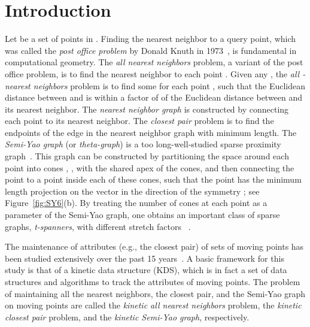\documentclass[11pt]{llncs}
\begin{document}
\section{Introduction}
Let  be a set of  points in . Finding the nearest neighbor to a query point, which was called the \textit{post office problem} by Donald Knuth in 1973~\cite{Knuth:1973:ACP}, is fundamental in computational geometry. The \textit{all nearest neighbors} problem, a variant of the post office problem, is to find the nearest neighbor to each point . Given any , the \textit{all -nearest neighbors} problem is to find some  for each point , such that the Euclidean distance  between  and  is within a factor of  of the Euclidean distance between  and its nearest neighbor. The \textit{nearest neighbor graph} is constructed by connecting each point  to its nearest neighbor. The \textit{closest pair} problem is to find the endpoints of the edge in the nearest neighbor graph with minimum length. The \textit{Semi-Yao graph} (or \textit{theta-graph}) is a too long-well-studied sparse proximity graph~\cite{Clarkson:1987:AAS:28395.28402,Keil:1988:ACE:61764.61787}. This graph can be constructed by partitioning the space around each point  into  cones , , with  the shared apex of the cones, and then connecting the point  to a point  inside each of these cones, such that the point  has the minimum length projection on the vector in the direction of the symmetry ; see Figure~\ref{fig:SY6}(b). By treating the number  of cones at each point as a parameter of the Semi-Yao graph, one obtains an important class of sparse graphs, \textit{t-spanners}, with different stretch factors ~\cite{BBCRV2013Theta4,Bonichon:2010:CTD:1939238.1939265,BMRV2013Theta5,BRV2013Theta4k345}. 

The maintenance of attributes (e.g., the closest pair) of sets of moving points has been studied extensively over the past 15 years~\cite{DBLP:conf/swat/RahmatiZ12,Agarwal:2003:IMP:846156.846166,Alexandron:2007:KDD:1219156.1219201,Basch:1997:DSM:314161.314435,Karavelas:2001:SKG:365411.365441,DBLP:conf/gd/RahmatiZ12,DBLP:conf/iwoca/RahmatiZ11,DBLP:conf/socg12/Natin}. A basic framework for this study  is that of a kinetic data structure (KDS), which is in fact a set of data structures and algorithms to track the attributes of moving points. The problem of maintaining all the nearest neighbors, the closest pair, and the Semi-Yao graph on moving points are called the \textit{kinetic all nearest neighbors} problem, the \textit{kinetic closest pair} problem, and the \textit{kinetic Semi-Yao graph}, respectively. 
\end{document}

